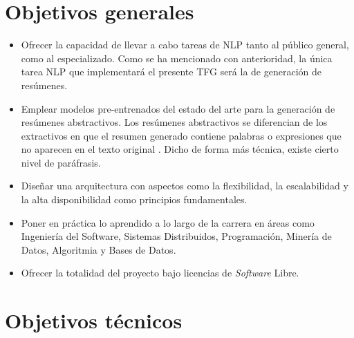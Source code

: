 
\section{Objetivos generales}

\begin{itemize}
	\item [\textbullet] Ofrecer la capacidad de llevar a cabo tareas de NLP tanto al público general, como al especializado. Como se ha mencionado con anterioridad, la única tarea NLP que implementará el presente TFG será la de generación de resúmenes.
	
	\item [\textbullet] Emplear modelos pre-entrenados del estado del arte para la generación de resúmenes abstractivos. Los resúmenes abstractivos se diferencian de los extractivos en que el resumen generado contiene palabras o expresiones que no aparecen en el texto original \cite{abigail17}. Dicho de forma más técnica, existe cierto nivel de paráfrasis.
	
	\item [\textbullet] Diseñar una arquitectura con aspectos como la flexibilidad, la escalabilidad y la alta disponibilidad como principios fundamentales.
	
	\item [\textbullet] Poner en práctica lo aprendido a lo largo de la carrera en áreas como Ingeniería del Software, Sistemas Distribuidos, Programación, Minería de Datos, Algoritmia y Bases de Datos.
	
	\item [\textbullet] Ofrecer la totalidad del proyecto bajo licencias de \emph{Software} Libre.
\end{itemize}

\bigskip

\section{Objetivos técnicos}

